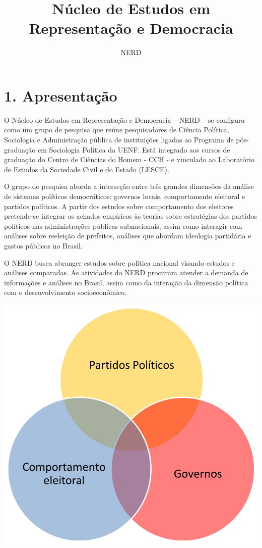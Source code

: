 \documentclass[
  12pt,
]{report}
\title{Núcleo de Estudos em Representação e Democracia}
\subtitle{NERD}
\author{}
\date{\vspace{-2.5em}}
\begin{document}
\maketitle

{
\setcounter{tocdepth}{1}
\tableofcontents
}
\pagebreak

\hypertarget{apresentauxe7uxe3o}{%
\section{1. Apresentação}\label{apresentauxe7uxe3o}}

O Núcleo de Estudos em Representação e Democracia -- NERD -- se
configura como um grupo de pesquisa que reúne pesquisadores de Ciência
Política, Sociologia e Administração pública de instituições ligadas ao
Programa de pós-graduação em Sociologia Política da UENF. Está integrado
aos cursos de graduação do Centro de Ciências do Homem - CCH - e
vinculado ao Laboratório de Estudos da Sociedade Civil e do Estado
(LESCE).

O grupo de pesquisa aborda a interseção entre três grandes dimensões da
análise de sistemas políticos democráticos: governos locais,
comportamento eleitoral e partidos políticos. A partir dos estudos sobre
comportamento dos eleitores pretende-se integrar os achados empíricos às
teorias sobre estratégias dos partidos políticos nas administrações
públicas subnacionais, assim como interagir com análises sobre reeleição
de prefeitos, análises que abordam ideologia partidária e gastos
públicos no Brasil.

O NERD busca abranger estudos sobre política nacional visando estudos e
análises comparadas. As atividades do NERD procuram atender a demanda de
informações e análises no Brasil, assim como da interação da dimensão
política com o desenvolvimento socioeconômico.

\includegraphics{nerd_diagrama_venn.png}
\end{document}
